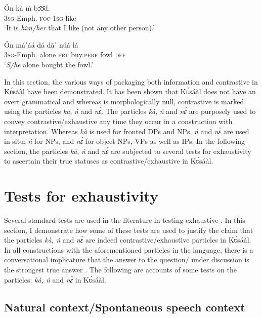 \documentclass[output=paper
,newtxmath
,modfonts
,nonflat]{langsci/langscibook}
\begin{document}
 
\ea\label{ex:abubakari:16} 
\gll \'{O}n    kà  \`{m}  bɔ̄ɔ̄d.\\
3\textsc{sg}-Emph.  \textsc{foc}  1\textsc{sg}  like\\
\glt ‘It is \textit{him/her} that I like (not any other person).’
\z
 
\ea\label{ex:abubakari:17} 
\gll \'{O}n    máˈáá  dá  dāˈ    núá  lá\\
3\textsc{sg}-Emph.  alone  \textsc{prt}  buy.\textsc{perf}  fowl  \textsc{def}\\
\glt ‘\textit{S/he} alone bought the fowl.’
\z

 
In this section, the various ways of packaging both information and contrastive  in Kʋ́sáàl have been demonstrated. It has been shown that Kʋ́sáàl does not have an overt grammatical  and whereas  is morphologically null, contrastive  is marked using the particles \textit{kà}, \textit{ń} and \textit{nɛ́}. The particles \textit{kà}, \textit{ń} and \textit{nɛ́} are purposely used to convey contrastive/exhaustive  any time they occur in a construction with  interpretation. Whereas \textit{kà} is used for fronted DPs and NPs, \textit{ń} and \textit{nɛ́} are used in-situ: \textit{ń} for  NPs, and \textit{nɛ́} for object NPs, VPs as well as IPs. In the following section, the particles \textit{kà}, \textit{ń} and \textit{nɛ́} are subjected to several tests for exhaustivity to ascertain their true statuses as contrastive/exhaustive  in Kʋ́sáàl.
 

\section{Tests for exhaustivity}

 
Several standard tests are used in the literature in testing exhaustive . In this section, I demonstrate how some of these tests are used to justify the claim that the particles \textit{kà, ń} and \textit{nɛ́} are indeed contrastive/exhaustive  particles in Kʋ́sáàl. In all  constructions with the aforementioned particles in the language, there is a conversational implicature that the answer to the question/ under discussion is the strongest true answer \citep{Beaver2008,roberts2012}. The following are accounts of some tests on the particles: \textit{kà, ń} and \textit{nɛ́} in Kʋ́sáàl.
 

\subsection{Natural context/Spontaneous speech context}
\end{document}
